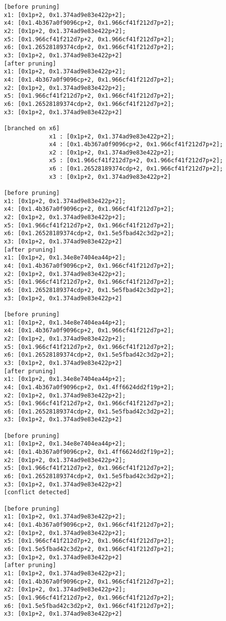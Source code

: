 \begin{lstlisting}
[before pruning]
x1: [0x1p+2, 0x1.374ad9e83e422p+2];
x4: [0x1.4b367a0f9096cp+2, 0x1.966cf41f212d7p+2];
x2: [0x1p+2, 0x1.374ad9e83e422p+2];
x5: [0x1.966cf41f212d7p+2, 0x1.966cf41f212d7p+2];
x6: [0x1.26528189374cdp+2, 0x1.966cf41f212d7p+2];
x3: [0x1p+2, 0x1.374ad9e83e422p+2]
[after pruning]
x1: [0x1p+2, 0x1.374ad9e83e422p+2];
x4: [0x1.4b367a0f9096cp+2, 0x1.966cf41f212d7p+2];
x2: [0x1p+2, 0x1.374ad9e83e422p+2];
x5: [0x1.966cf41f212d7p+2, 0x1.966cf41f212d7p+2];
x6: [0x1.26528189374cdp+2, 0x1.966cf41f212d7p+2];
x3: [0x1p+2, 0x1.374ad9e83e422p+2]

[branched on x6]
             x1 : [0x1p+2, 0x1.374ad9e83e422p+2];
             x4 : [0x1.4b367a0f9096cp+2, 0x1.966cf41f212d7p+2];
             x2 : [0x1p+2, 0x1.374ad9e83e422p+2];
             x5 : [0x1.966cf41f212d7p+2, 0x1.966cf41f212d7p+2];
             x6 : [0x1.26528189374cdp+2, 0x1.966cf41f212d7p+2];
             x3 : [0x1p+2, 0x1.374ad9e83e422p+2]

[before pruning]
x1: [0x1p+2, 0x1.374ad9e83e422p+2];
x4: [0x1.4b367a0f9096cp+2, 0x1.966cf41f212d7p+2];
x2: [0x1p+2, 0x1.374ad9e83e422p+2];
x5: [0x1.966cf41f212d7p+2, 0x1.966cf41f212d7p+2];
x6: [0x1.26528189374cdp+2, 0x1.5e5fbad42c3d2p+2];
x3: [0x1p+2, 0x1.374ad9e83e422p+2]
[after pruning]
x1: [0x1p+2, 0x1.34e8e7404ea44p+2];
x4: [0x1.4b367a0f9096cp+2, 0x1.966cf41f212d7p+2];
x2: [0x1p+2, 0x1.374ad9e83e422p+2];
x5: [0x1.966cf41f212d7p+2, 0x1.966cf41f212d7p+2];
x6: [0x1.26528189374cdp+2, 0x1.5e5fbad42c3d2p+2];
x3: [0x1p+2, 0x1.374ad9e83e422p+2]

[before pruning]
x1: [0x1p+2, 0x1.34e8e7404ea44p+2];
x4: [0x1.4b367a0f9096cp+2, 0x1.966cf41f212d7p+2];
x2: [0x1p+2, 0x1.374ad9e83e422p+2];
x5: [0x1.966cf41f212d7p+2, 0x1.966cf41f212d7p+2];
x6: [0x1.26528189374cdp+2, 0x1.5e5fbad42c3d2p+2];
x3: [0x1p+2, 0x1.374ad9e83e422p+2]
[after pruning]
x1: [0x1p+2, 0x1.34e8e7404ea44p+2];
x4: [0x1.4b367a0f9096cp+2, 0x1.4ff6624dd2f19p+2];
x2: [0x1p+2, 0x1.374ad9e83e422p+2];
x5: [0x1.966cf41f212d7p+2, 0x1.966cf41f212d7p+2];
x6: [0x1.26528189374cdp+2, 0x1.5e5fbad42c3d2p+2];
x3: [0x1p+2, 0x1.374ad9e83e422p+2]

[before pruning]
x1: [0x1p+2, 0x1.34e8e7404ea44p+2];
x4: [0x1.4b367a0f9096cp+2, 0x1.4ff6624dd2f19p+2];
x2: [0x1p+2, 0x1.374ad9e83e422p+2];
x5: [0x1.966cf41f212d7p+2, 0x1.966cf41f212d7p+2];
x6: [0x1.26528189374cdp+2, 0x1.5e5fbad42c3d2p+2];
x3: [0x1p+2, 0x1.374ad9e83e422p+2]
[conflict detected]

[before pruning]
x1: [0x1p+2, 0x1.374ad9e83e422p+2];
x4: [0x1.4b367a0f9096cp+2, 0x1.966cf41f212d7p+2];
x2: [0x1p+2, 0x1.374ad9e83e422p+2];
x5: [0x1.966cf41f212d7p+2, 0x1.966cf41f212d7p+2];
x6: [0x1.5e5fbad42c3d2p+2, 0x1.966cf41f212d7p+2];
x3: [0x1p+2, 0x1.374ad9e83e422p+2]
[after pruning]
x1: [0x1p+2, 0x1.374ad9e83e422p+2];
x4: [0x1.4b367a0f9096cp+2, 0x1.966cf41f212d7p+2];
x2: [0x1p+2, 0x1.374ad9e83e422p+2];
x5: [0x1.966cf41f212d7p+2, 0x1.966cf41f212d7p+2];
x6: [0x1.5e5fbad42c3d2p+2, 0x1.966cf41f212d7p+2];
x3: [0x1p+2, 0x1.374ad9e83e422p+2]


\end{lstlisting}
